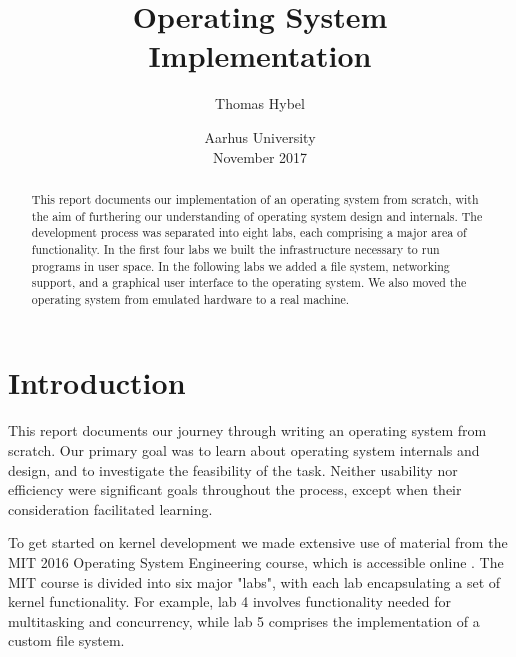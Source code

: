 \documentclass{report}
\begin{document}


\title{Operating System \\ Implementation}
\author{Thomas Hybel}
\date{Aarhus University \\ November 2017}
\maketitle




\begin{abstract} 
\noindent 
This report documents our implementation of an operating system from scratch,
with the aim of furthering our understanding of operating system design and
internals. The development process was separated into eight labs, each
comprising a major area of functionality. In the first four labs we built the
infrastructure necessary to run programs in user space. In the following labs
we added a file system, networking support, and a graphical user interface to
the operating system. We also moved the operating system from emulated
hardware to a real machine.
\end{abstract}
\newpage


\tableofcontents

\newpage
{}




\chapter{Introduction}
This report documents our journey through writing an operating system from
scratch. Our primary goal was to learn about operating system internals and
design, and to investigate the feasibility of the task. Neither usability nor
efficiency were significant goals throughout the process, except when
their consideration facilitated learning.

To get started on kernel development we made extensive use of material from
the MIT 2016 Operating System Engineering course, which is
accessible online \cite{mitcourse}. The MIT course is divided into six major
"labs", with each lab encapsulating a set of kernel functionality. For
example, lab 4 involves functionality needed for multitasking and concurrency,
while lab 5 comprises the implementation of a custom file system. 
\end{document}
